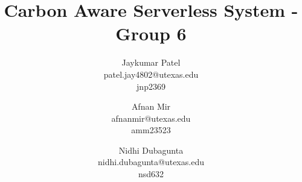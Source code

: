 \documentclass[times, 10pt,twocolumn]{article}
\begin{document}
\title{Carbon Aware Serverless System - Group 6}

\author{Jaykumar Patel\\
patel.jay4802@utexas.edu\\
jnp2369\\
\and
Afnan Mir\\
afnanmir@utexas.edu\\
amm23523\\
\and
Nidhi Dubagunta\\
nidhi.dubagunta@utexas.edu \\
nsd632\\
}



\maketitle
\thispagestyle{empty}
\end{document}
